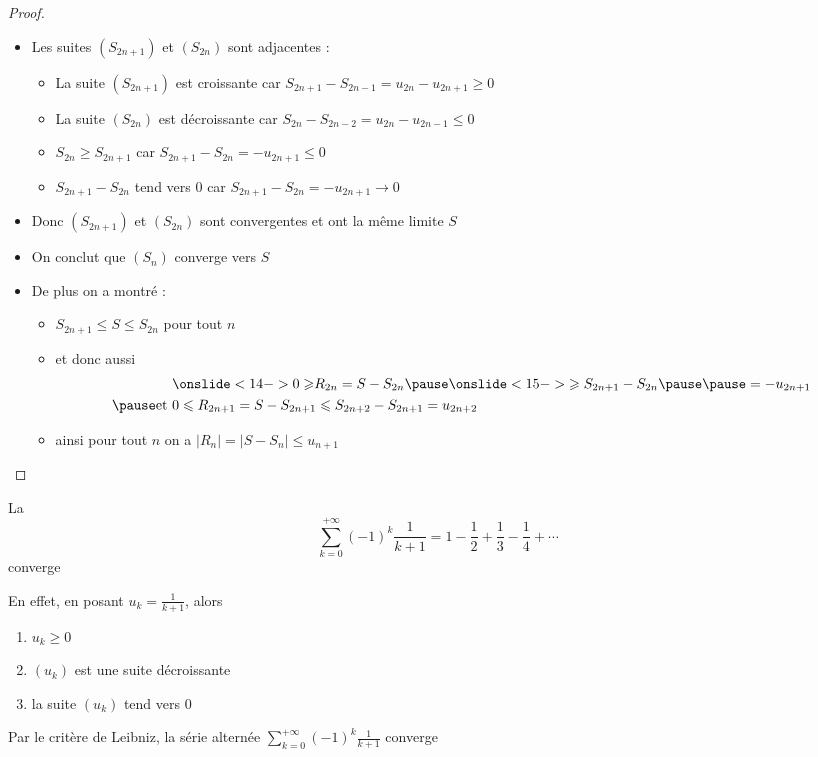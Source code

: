 \begin{frame}
\begin{proof}
\begin{itemize}
\item Les suites $(S_{2n+1})$ et $(S_{2n})$ sont adjacentes :
\begin{itemize}
  \item\pause La suite $(S_{2n+1})$ est croissante \pause car 
  $S_{2n+1}-S_{2n-1}=u_{2n}-u_{2n+1}\ge 0$
  
  \item\pause La suite $(S_{2n})$ est décroissante \pause car
  $S_{2n}-S_{2n-2}= u_{2n}-u_{2n-1}\le 0$
  
  \item\pause $S_{2n} \ge S_{2n+1}$ \pause car 
  $S_{2n+1} - S_{2n} = -u_{2n+1} \le 0$ 
  
  \item\pause $S_{2n+1} - S_{2n}$ tend vers $0$ \pause car $S_{2n+1} - S_{2n} = -u_{2n+1} \to 0$
\end{itemize}
\item\pause Donc $(S_{2n+1})$ et $(S_{2n})$ sont convergentes et ont la même limite $S$
\item\pause On conclut que $(S_n)$ converge vers $S$
\item\pause De plus on a montré :
\begin{itemize}
  \item $S_{2n+1} \le S \le S_{2n}$ pour tout $n$
\item\pause et donc aussi
 \begin{eqnarray*}
 &\onslide<14->{0\ge} R_{2n}= S-S_{2n} \pause\onslide<15->{\ge S_{2n+1}-S_{2n}} \pause\pause =-u_{2n+1}\\\pause
 \text{et } &0 \le R_{2n+1}= S-S_{2n+1} \le  S_{2n+2} -S_{2n+1} = u_{2n+2}
 \end{eqnarray*}
 \item\pause ainsi pour tout $n$ on a 
 $|R_n|=|S-S_n|\le  u_{n+1}$\qedhere
\end{itemize}
\end{itemize}
\end{proof}
\end{frame}

\begin{frame}
\begin{exemple}
La  
$$\sum_{k=0}^{+\infty} (-1)^{k} \frac{1}{k+1} = 1-\frac{1}{2}+\frac{1}{3}-\frac{1}{4} + \cdots $$
converge

\vspace{.3cm}\pause 
En effet, en posant $u_k = \frac{1}{k+1}$, alors
\begin{enumerate}
  \item\pause  $u_k\ge0$
  \item\pause  $(u_k)$ est une suite décroissante
  \item\pause  la suite $(u_k)$ tend vers $0$
\end{enumerate}
\pause 
Par le critère de Leibniz, la série alternée
$\displaystyle\sum_{k=0}^{+\infty} (-1)^{k} \frac{1}{k+1}$ converge
\end{exemple}
\end{frame}


